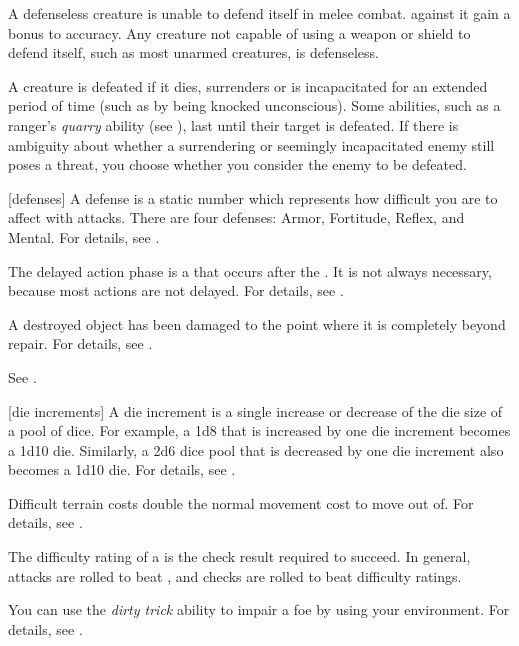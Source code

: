  A defenseless creature is unable to defend itself in melee combat.
 against it gain a  bonus to accuracy.
Any creature not capable of using a weapon or shield to defend itself, such as most unarmed creatures, is defenseless.

 A creature is defeated if it dies, surrenders or is incapacitated for an extended period of time (such as by being knocked unconscious).
Some abilities, such as a ranger's \textit{quarry} ability (see ), last until their target is defeated.
If there is ambiguity about whether a surrendering or seemingly incapacitated enemy still poses a threat, you choose whether you consider the enemy to be defeated.

[defenses] A defense is a static number which represents how difficult you are to affect with attacks.
There are four defenses: Armor, Fortitude, Reflex, and Mental.
For details, see .

 The delayed action phase is a  that occurs after the .
It is not always necessary, because most actions are not delayed.
For details, see .

 A destroyed object has been damaged to the point where it is completely beyond repair.
For details, see .

 See .

[die increments] A die increment is a single increase or decrease of the die size of a pool of dice.
For example, a 1d8 that is increased by one die increment becomes a 1d10 die.
Similarly, a 2d6 dice pool that is decreased by one die increment also becomes a 1d10 die.
For details, see .

 Difficult terrain costs double the normal movement cost to move out of.
For details, see .

 The difficulty rating of a  is the check result required to succeed.
In general, attacks are rolled to beat , and checks are rolled to beat difficulty ratings.

 You can use the \textit{dirty trick} ability to impair a foe by using your environment.
For details, see .

